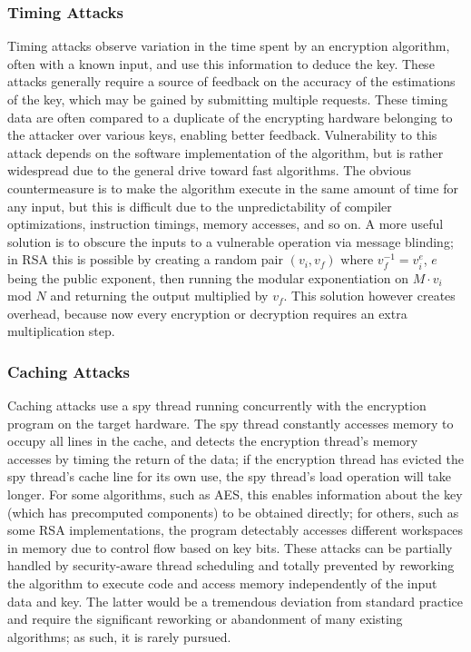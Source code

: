 \documentclass[times, 10pt,twocolumn]{article}
\begin{document}
\subsubsection{Timing Attacks}
Timing attacks observe variation in the time spent by an encryption algorithm, often with a known input, and use this information to deduce the key.  These attacks generally require a source of feedback on the accuracy of the estimations of the key, which may be gained by submitting multiple requests. These timing data are often compared to a duplicate of the encrypting hardware belonging to the attacker over various keys, enabling better feedback.  Vulnerability to this attack depends on the software implementation of the algorithm, but is rather widespread due to the general drive toward fast algorithms.  The obvious countermeasure is to make the algorithm execute in the same amount of time for any input, but this is difficult due to the unpredictability of compiler optimizations, instruction timings, memory accesses, and so on.  A more useful solution is to obscure the inputs to a vulnerable operation via message blinding\cite{mmthesis}; in RSA this is possible by creating a random pair $(v_{i},v_{f})$ where $v_{f}^{-1}=v_{i}^e$, $e$ being the public exponent, then running the modular exponentiation on $M\cdot v_{i}$ mod $N$ and returning the output multiplied by $v_{f}$\cite{Kocher96timingattacks}. This solution however creates overhead, because now every encryption or decryption requires an extra multiplication step. 

\subsubsection{Caching Attacks}
Caching attacks use a spy thread running concurrently with the encryption program on the target hardware.  The spy thread constantly accesses memory to occupy all lines in the cache, and detects the encryption thread's memory accesses by timing the return of the data; if the encryption thread has evicted the spy thread's cache line for its own use, the spy thread's load operation will take longer.  For some algorithms, such as AES\cite{2004-bernstein-cachetiming}, this enables information about the key (which has precomputed components) to be obtained directly; for others, such as some RSA implementations\cite{Percival05cachemissing}, the program detectably accesses different workspaces in memory due to control flow based on key bits.  These attacks can be partially handled by security-aware thread scheduling and totally prevented by reworking the algorithm to execute code and access memory independently of the input data and key.  The latter would be a tremendous deviation from standard practice and require the significant reworking or abandonment of many existing algorithms\cite{Percival05cachemissing}; as such, it is rarely pursued.
\end{document}
